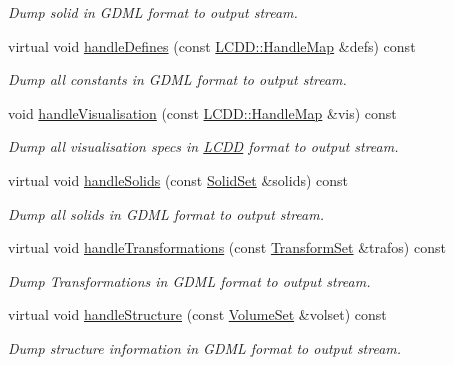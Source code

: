\begin{DoxyCompactItemize}
\begin{DoxyCompactList}\small\item\em Dump solid in GDML format to output stream. \item\end{DoxyCompactList}\item 
virtual void \hyperlink{class_d_d4hep_1_1_geometry_1_1_geometry_tree_dump_a216c679866330a96fd46c757c330e12d}{handleDefines} (const \hyperlink{class_d_d4hep_1_1_geometry_1_1_l_c_d_d_a05cb11e7355772c7b0794bcca59bf477}{LCDD::HandleMap} \&defs) const 
\begin{DoxyCompactList}\small\item\em Dump all constants in GDML format to output stream. \item\end{DoxyCompactList}\item 
void \hyperlink{class_d_d4hep_1_1_geometry_1_1_geometry_tree_dump_a5478dd607f618b26797e58a8f85b3001}{handleVisualisation} (const \hyperlink{class_d_d4hep_1_1_geometry_1_1_l_c_d_d_a05cb11e7355772c7b0794bcca59bf477}{LCDD::HandleMap} \&vis) const 
\begin{DoxyCompactList}\small\item\em Dump all visualisation specs in \hyperlink{class_d_d4hep_1_1_geometry_1_1_l_c_d_d}{LCDD} format to output stream. \item\end{DoxyCompactList}\item 
virtual void \hyperlink{class_d_d4hep_1_1_geometry_1_1_geometry_tree_dump_a1cc5f19fc66c9e73f4837824f252a2c5}{handleSolids} (const \hyperlink{class_d_d4hep_1_1_geometry_1_1_geo_handler_types_a85d065cdf670a4f9ea9c0c4dee921fce}{SolidSet} \&solids) const 
\begin{DoxyCompactList}\small\item\em Dump all solids in GDML format to output stream. \item\end{DoxyCompactList}\item 
virtual void \hyperlink{class_d_d4hep_1_1_geometry_1_1_geometry_tree_dump_a60d1dac798ae2ea18d8576177db5328c}{handleTransformations} (const \hyperlink{class_d_d4hep_1_1_geometry_1_1_geo_handler_types_aa52b3113e87db04c37666e85a9b5e569}{TransformSet} \&trafos) const 
\begin{DoxyCompactList}\small\item\em Dump Transformations in GDML format to output stream. \item\end{DoxyCompactList}\item 
virtual void \hyperlink{class_d_d4hep_1_1_geometry_1_1_geometry_tree_dump_aa8d35f8c4a4a98701c9e30e7af6a85e6}{handleStructure} (const \hyperlink{class_d_d4hep_1_1_geometry_1_1_geo_handler_types_a87ea3b22bdfe08f1a4afca3d58fd8ca0}{VolumeSet} \&volset) const 
\begin{DoxyCompactList}\small\item\em Dump structure information in GDML format to output stream. \item\end{DoxyCompactList}\end{DoxyCompactItemize}


